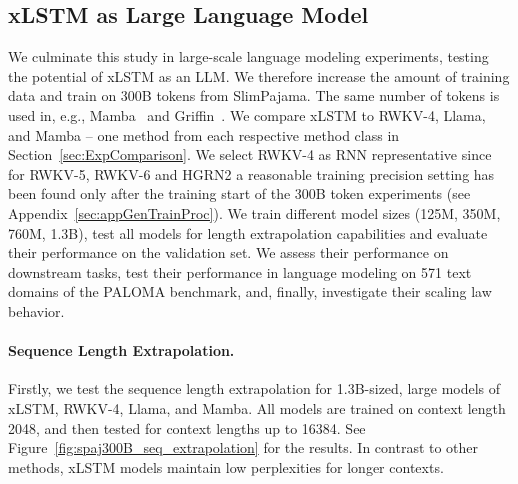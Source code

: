 \documentclass[dvipsnames]{article}
\begin{document}
\clearpage


\clearpage

\subsection{xLSTM as Large Language Model}
\label{sec:ExpLanguage}

We culminate this study in large-scale language modeling experiments, testing the potential of xLSTM as an LLM. 
We therefore increase the amount of training data and train on 300B tokens from SlimPajama. The same number of tokens is used in, e.g., Mamba~\citep{Gu:24arxiv} and Griffin~\citep{De:24arxiv}.
We compare xLSTM
to RWKV-4, Llama, and Mamba – one method from each respective method class in Section~\ref{sec:ExpComparison}.
We select RWKV-4 as RNN representative since for RWKV-5, RWKV-6 and HGRN2 a reasonable
training precision setting has been found only after the training start of the
300B token experiments (see Appendix~\ref{sec:appGenTrainProc}).
We train different model sizes (125M, 350M, 760M, 1.3B), 
test all models for length extrapolation capabilities 
and evaluate their performance on the validation set.
We assess their performance on downstream tasks,
test their performance in language modeling 
on 571 text domains of the PALOMA benchmark, 
and, finally, investigate their scaling law behavior.

\vspace{-0.2cm}
\paragraph{Sequence Length Extrapolation.}
\label{sec:spaj300B_ctx_extrapolation}
Firstly, we test the sequence length extrapolation 
for 1.3B-sized, large models of xLSTM, RWKV-4, Llama, and Mamba.  
All models are trained on context length 2048, 
and then tested for context lengths up to 16384.
See Figure~\ref{fig:spaj300B_seq_extrapolation} for the results.
In contrast to other methods, xLSTM models maintain
low perplexities for longer contexts.
\end{document}
